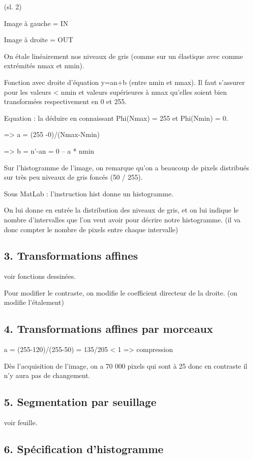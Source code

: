 \documentclass{report}
\begin{document}
(sl. 2) 

Image à gauche = IN

Image à droite = OUT

On étale linéairement nos niveaux de gris (comme sur un élastique avec comme extrémités nmax et nmin).

Fonction avec droite d'équation y=an+b (entre nmin et nmax). Il faut s'assurer pour les valeurs < nmin et valeurs supérieures à nmax qu'elles soient bien transformées respectivement en 0 et 255.

Equation : la déduire en connaissant Phi(Nmax) = 255 et Phi(Nmin) = 0.

	=> a = (255 -0)/(Nmax-Nmin)

	=> b = n'-an = 0 – a * nmin

Sur l'histogramme de l'image, on remarque qu'on a beaucoup de pixels distribués sur très peu niveaux de gris foncés (50 / 255).

Sous MatLab : l'instruction hist donne un histogramme. 

On lui donne en entrée la distribution des niveaux de gris, et on lui indique le nombre d'intervalles que l'on veut avoir pour décrire notre histogramme. (il va donc compter le nombre de pixels entre chaque intervalle)

	\subsection*{3. Transformations affines}

voir fonctions dessinées.

Pour modifier le contraste, on modifie le coefficient directeur de la droite. (on modifie l'étalement)


	\subsection*{4. Transformations affines par morceaux}

a = (255-120)/(255-50) = 135/205 < 1 => compression

Dès l'acquisition de l'image, on a 70 000 pixels qui sont à 25 donc en contraste il n'y aura pas de changement.

	\subsection*{5. Segmentation par seuillage}

voir feuille.


	\subsection*{6. Spécification d'histogramme}
\end{document}
